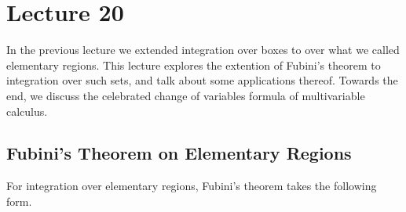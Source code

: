 \documentclass[../Analysis-3.tex]{subfiles}
\begin{document}
\chapter*{Lecture 20} %
\setcounter{chapter}{20} %
\setcounter{section}{0}
\setcounter{equation}{0}
\setcounter{figure}{0}




In the previous lecture we extended integration over boxes to over what we called elementary regions. This lecture explores the extention of Fubini's theorem to integration over such sets, and talk about some applications thereof. Towards the end, we discuss the celebrated change of variables formula of multivariable calculus.

\section{Fubini's Theorem on Elementary Regions}

For integration over elementary regions, Fubini's theorem takes the following form.\\[.1 cm]
\end{document}
